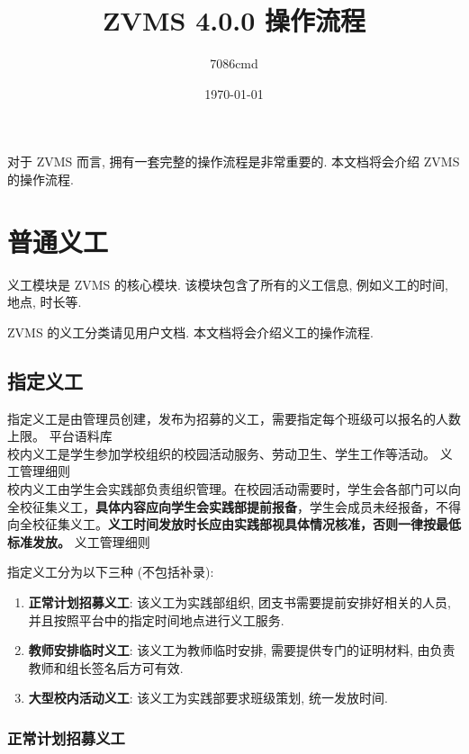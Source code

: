 \documentclass{article}
\title{ZVMS 4.0.0 操作流程}
\author{7086cmd}
\date{\today}
\begin{document}
\maketitle

对于 ZVMS 而言, 拥有一套完整的操作流程是非常重要的. 本文档将会介绍 ZVMS 的操作流程.

\tableofcontents

\section{普通义工}

义工模块是 ZVMS 的核心模块. 该模块包含了所有的义工信息, 例如义工的时间, 地点, 时长等.

ZVMS 的义工分类请见用户文档. 本文档将会介绍义工的操作流程.

\subsection{指定义工}

\begin{mdframed}
  \fangsong
  指定义工是由管理员创建，发布为招募的义工，需要指定每个班级可以报名的人数上限。 \hfill 平台语料库 \\
  校内义工是学生参加学校组织的校园活动服务、劳动卫生、学生工作等活动。 \hfill 义工管理细则 \\
  校内义工由学生会实践部负责组织管理。在校园活动需要时，学生会各部门可以向全校征集义工，\textbf{具体内容应向学生会实践部提前报备}，学生会成员未经报备，不得向全校征集义工。\textbf{义工时间发放时长应由实践部视具体情况核准，否则一律按最低标准发放。} \hfill 义工管理细则
\end{mdframed}

指定义工分为以下三种 (不包括补录):

\begin{enumerate}
  \item \textbf{正常计划招募义工}: 该义工为实践部组织, 团支书需要提前安排好相关的人员, 并且按照平台中的指定时间地点进行义工服务.
  \item \textbf{教师安排临时义工}: 该义工为教师临时安排, 需要提供专门的证明材料, 由负责教师和组长签名后方可有效.
  \item \textbf{大型校内活动义工}: 该义工为实践部要求班级策划, 统一发放时间.
\end{enumerate}

\subsubsection{正常计划招募义工}
\end{document}
